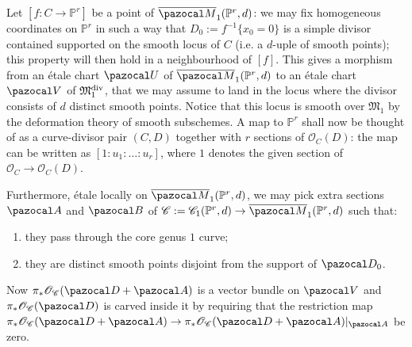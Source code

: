 \documentclass[11pt]{amsart}
\newcommand{\PP}{\mathbb P}
\newcommand{\OO}{\mathcal O}
\renewcommand{\to}{\rightarrow}
\newcommand{\cC}{\mathcal C}
\newcommand{\oM}{\overline{\pazocal M}}
\theoremstyle{plain}
\theoremstyle{definition}
\begin{document}
Let $[f\colon C\to \PP^r]$ be a point of $\oM_1(\PP^r,d)$: we may fix homogeneous coordinates on $\PP^r$ in such a way that $D_0:=f^{-1}\{x_0=0\}$ is a simple divisor contained supported on the smooth locus of $C$ (i.e. a $d$-uple of smooth points); this property will then hold in a neighbourhood of $[f]$. This gives a morphism from an \'{e}tale chart $\pazocal U$ of $\oM_1(\PP^r,d)$ to an \'{e}tale chart $\pazocal V$ of $\mathfrak M_{1}^{\rm{div}}$, that we may assume to land in the locus where the divisor consists of $d$ distinct smooth points. Notice that this locus is smooth over $\mathfrak M_{1}$ by the deformation theory of smooth subschemes. A map to $\PP^r$ shall now be thought of as a curve-divisor pair $(C,D)$ together with $r$ sections of $\mathcal O_C(D)$: the map can be written as $[1:u_1:\ldots:u_r]$, where $1$ denotes the given section of $\mathcal O_C\to\mathcal O_C(D)$.


Furthermore, \'{e}tale locally on $\oM_1(\PP^r,d)$, we may pick extra sections $\pazocal A$ and $\pazocal B$ of $\cC:=\mathcal C_{1}(\PP^r,d)\to\oM_1(\PP^r,d)$ such that:
\begin{enumerate}
\item they pass through the core genus $1$ curve;
\item they are distinct smooth points disjoint from the support of $\pazocal D_0$. 
\end{enumerate}
Now  $\pi_*\OO_{\cC}(\pazocal D+\pazocal A)$ is a vector bundle on $\pazocal V$ and $\pi_*\OO_{\cC}(\pazocal D)$ is carved inside it by requiring that the restriction map $\pi_*\OO_{\cC}(\pazocal D+\pazocal A)\to\pi_*\OO_{\cC}(\pazocal D+\pazocal A)\rvert_{\pazocal A}$ be zero.
\end{document}
